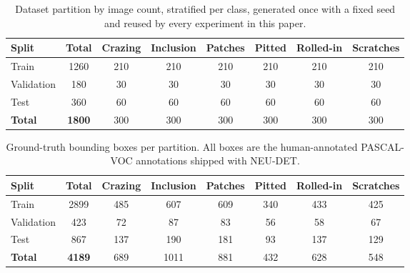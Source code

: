 %
%
%


\begin{table}[t]
\centering
\caption{Dataset partition by image count, stratified per class, generated once with a fixed seed and reused by every experiment in this paper.}
\label{tab:split_images}
\renewcommand{\arraystretch}{1.15}
\begin{tabular}{lccccccc}
\toprule
\textbf{Split} & \textbf{Total} & \textbf{Crazing} & \textbf{Inclusion} & \textbf{Patches} & \textbf{Pitted} & \textbf{Rolled-in} & \textbf{Scratches} \\
\midrule
Train & 1260 & 210 & 210 & 210 & 210 & 210 & 210 \\
Validation & 180 & 30 & 30 & 30 & 30 & 30 & 30 \\
Test & 360 & 60 & 60 & 60 & 60 & 60 & 60 \\
\midrule
\textbf{Total} & \textbf{1800} & 300 & 300 & 300 & 300 & 300 & 300 \\
\bottomrule
\end{tabular}
\end{table}


\begin{table}[t]
\centering
\caption{Ground-truth bounding boxes per partition. All boxes are the human-annotated PASCAL-VOC annotations shipped with NEU-DET.}
\label{tab:split_boxes}
\renewcommand{\arraystretch}{1.15}
\begin{tabular}{lccccccc}
\toprule
\textbf{Split} & \textbf{Total} & \textbf{Crazing} & \textbf{Inclusion} & \textbf{Patches} & \textbf{Pitted} & \textbf{Rolled-in} & \textbf{Scratches} \\
\midrule
Train & 2899 & 485 & 607 & 609 & 340 & 433 & 425 \\
Validation & 423 & 72 & 87 & 83 & 56 & 58 & 67 \\
Test & 867 & 137 & 190 & 181 & 93 & 137 & 129 \\
\midrule
\textbf{Total} & \textbf{4189} & 689 & 1011 & 881 & 432 & 628 & 548 \\
\bottomrule
\end{tabular}
\end{table}


